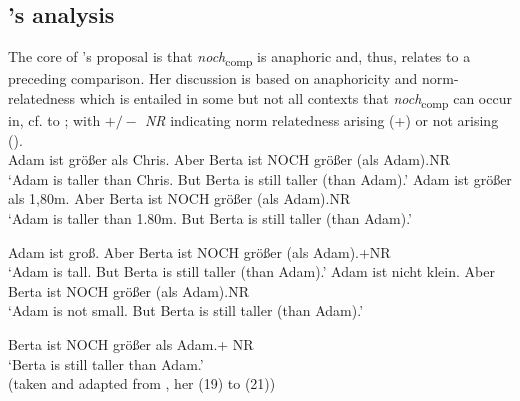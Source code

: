 \documentclass[output=paper,
modfonts
]{langscibook}
\begin{document}
\subsection{\citeauthor{umbach2009a_comp}'s \citeyearpar{umbach2009a_comp} analysis} \label{SubSec_umbach_analysis}

The core of \citeauthor{umbach2009a_comp}'s \citeyearpar{umbach2009a_comp} proposal is that \textit{noch}\textsubscript{comp} is anaphoric and, thus, relates to a preceding comparison. Her discussion is based on anaphoricity and norm-relatedness which is entailed in some but not all contexts that \textit{noch}\textsubscript{comp} can occur in, cf.  to ; with \textit{$+/-$ NR} indicating norm relatedness arising (+) or not arising (\textminus).\\


\ea \label{umbach_19} \ea \small Adam ist größer als Chris. Aber Berta ist NOCH größer (als Adam).\hfill \textminus NR\\ {`Adam is taller than Chris. But Berta is still taller (than Adam).'} \label{umbach_19a}
\ex \small Adam ist größer als 1,80m. Aber Berta ist NOCH größer (als Adam).\hfill \textminus NR\\ {`Adam is taller than 1.80m. But Berta is still taller (than Adam).'} \label{umbach_19b}\\
   \z\z

\ea\label{umbach_20} \ea\small Adam ist groß. Aber Berta ist NOCH größer (als Adam).\hfill +NR\\ {`Adam is tall. But Berta is still taller (than Adam).'} \label{umbach_20a}
\ex\small Adam ist nicht klein. Aber Berta ist NOCH größer (als Adam).\hfill \textminus NR\\ {`Adam is not small. But Berta is still taller (than Adam).'} \label{umbach_20b}\\
\z\z

\ea\small\label{umbach_21} Berta ist NOCH größer als Adam.\hfill + NR\\ {`Berta is still taller than Adam.'} \\ (taken and adapted from \citealt{umbach2009a_comp}, her (19) to (21))\z
\end{document}
